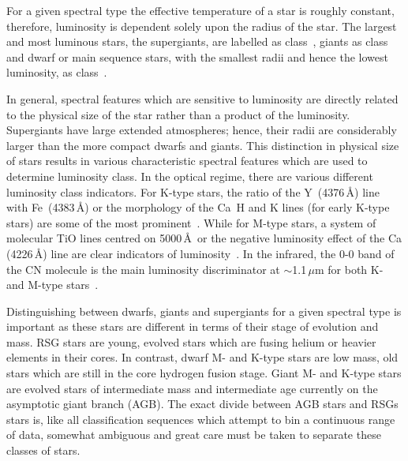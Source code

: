 For a given spectral type the effective temperature of a star is roughly constant, therefore, luminosity is dependent solely upon the radius of the star.
The largest and most luminous stars, the supergiants, are labelled as class~\1, giants as class~\3 and dwarf or main sequence stars, with the smallest radii and hence the lowest luminosity, as class~\5.

In general, spectral features which are sensitive to luminosity are directly related to the physical size of the star rather than a product of the luminosity.
Supergiants have large extended atmospheres; hence, their radii are considerably larger than the more compact dwarfs and giants.
This distinction in physical size of stars results in various characteristic spectral features which are used to determine luminosity class.
In the optical regime, there are various different luminosity class indicators.
For K-type stars, the ratio of the Y\,\2 (4376\,\AA) line with Fe\,\1 (4383\,\AA) or the morphology of the Ca\,\2 H and K lines (for early K-type stars) are some of the most prominent~\citep{b:GrayCorbally}.
While for M-type stars, a system of molecular TiO lines centred on 5000\,\AA ~or the negative luminosity effect of the Ca\,\1 (4226\,\AA) line are clear indicators of luminosity~\citep{b:GrayCorbally}.
In the infrared, the 0-0 band of the CN molecule is the main luminosity discriminator at $\sim$1.1\,$\mu$m for both K- and M-type stars~\citep{b:GrayCorbally}.




Distinguishing between dwarfs, giants and supergiants for a given spectral type is important as these stars are different in terms of their stage of evolution and mass.
RSG stars are young, evolved stars which are fusing helium or heavier elements in their cores.
In contrast, dwarf M- and K-type stars are low mass, old stars which are still in the core hydrogen fusion stage.
Giant M- and K-type stars are evolved stars of intermediate mass and intermediate age currently on the asymptotic giant branch (AGB).
The exact divide between AGB stars and RSGs stars is, like all classification sequences which attempt to bin a continuous range of data, somewhat ambiguous and great care must be taken to separate these classes of stars.

